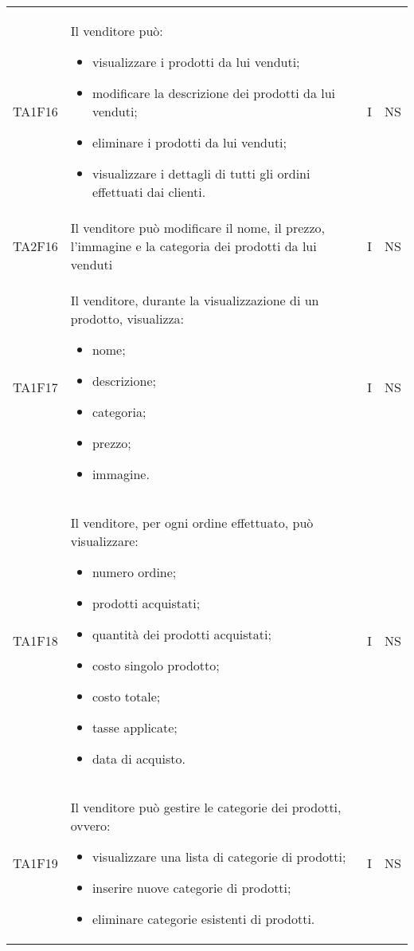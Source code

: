 {\begin{longtable}{C{2cm} C{9.6cm} C{1.5cm} C{1cm}}
TA1F16 & Il venditore può:
\begin{itemize}
	\item visualizzare i prodotti da lui venduti;
	\item modificare la descrizione dei prodotti da lui venduti;
	\item eliminare i prodotti da lui venduti;
	\item visualizzare i dettagli di tutti gli ordini effettuati dai clienti.
\end{itemize} & I & NS\\

TA2F16 & Il venditore può modificare il nome, il prezzo, l'immagine e la categoria dei prodotti da lui venduti & I & NS\\

TA1F17 & Il venditore, durante la visualizzazione di un prodotto, visualizza:
\begin{itemize}
	\item nome;
	\item descrizione;
	\item categoria;
	\item prezzo;
	\item immagine.
\end{itemize} & I & NS\\

TA1F18 & Il venditore, per ogni ordine effettuato, può visualizzare:
\begin{itemize}
	\item numero ordine;
	\item prodotti acquistati;
	\item quantità dei prodotti acquistati;
	\item costo singolo prodotto;
	\item costo totale;
	\item tasse applicate;
	\item data di acquisto.
\end{itemize}
& I & NS\\

TA1F19 & Il venditore può gestire le categorie dei prodotti, ovvero:
\begin{itemize}
	\item visualizzare una lista di categorie di prodotti;
	\item inserire nuove categorie di prodotti;
	\item eliminare categorie esistenti di prodotti.
\end{itemize}
& I & NS\\






\end{longtable}}
